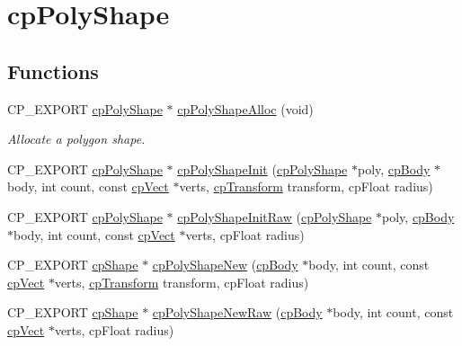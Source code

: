 \hypertarget{group__cpPolyShape}{}\section{cp\+Poly\+Shape}
\label{group__cpPolyShape}
\subsection*{Functions}
\begin{DoxyCompactItemize}
\item 
\mbox{\label{group__cpPolyShape_ga034bc6db096bcf82b76134075dc44f4f}} 
C\+P\+\_\+\+E\+X\+P\+O\+RT \hyperlink{structcpPolyShape}{cp\+Poly\+Shape} $\ast$ \hyperlink{group__cpPolyShape_ga034bc6db096bcf82b76134075dc44f4f}{cp\+Poly\+Shape\+Alloc} (void)
\begin{DoxyCompactList}\small\item\em Allocate a polygon shape. \end{DoxyCompactList}\item 
C\+P\+\_\+\+E\+X\+P\+O\+RT \hyperlink{structcpPolyShape}{cp\+Poly\+Shape} $\ast$ \hyperlink{group__cpPolyShape_ga8f30c48538498234bed45abc3c16b80d}{cp\+Poly\+Shape\+Init} (\hyperlink{structcpPolyShape}{cp\+Poly\+Shape} $\ast$poly, \hyperlink{structcpBody}{cp\+Body} $\ast$body, int count, const \hyperlink{structcpVect}{cp\+Vect} $\ast$verts, \hyperlink{structcpTransform}{cp\+Transform} transform, cp\+Float radius)
\item 
C\+P\+\_\+\+E\+X\+P\+O\+RT \hyperlink{structcpPolyShape}{cp\+Poly\+Shape} $\ast$ \hyperlink{group__cpPolyShape_ga9f76eb48b88f99b70639abbec33fb73a}{cp\+Poly\+Shape\+Init\+Raw} (\hyperlink{structcpPolyShape}{cp\+Poly\+Shape} $\ast$poly, \hyperlink{structcpBody}{cp\+Body} $\ast$body, int count, const \hyperlink{structcpVect}{cp\+Vect} $\ast$verts, cp\+Float radius)
\item 
C\+P\+\_\+\+E\+X\+P\+O\+RT \hyperlink{structcpShape}{cp\+Shape} $\ast$ \hyperlink{group__cpPolyShape_gaed41237141b0ef9066117a829bfce9e0}{cp\+Poly\+Shape\+New} (\hyperlink{structcpBody}{cp\+Body} $\ast$body, int count, const \hyperlink{structcpVect}{cp\+Vect} $\ast$verts, \hyperlink{structcpTransform}{cp\+Transform} transform, cp\+Float radius)
\item 
C\+P\+\_\+\+E\+X\+P\+O\+RT \hyperlink{structcpShape}{cp\+Shape} $\ast$ \hyperlink{group__cpPolyShape_ga9f913d3ac1991e4d248b1a51357a176a}{cp\+Poly\+Shape\+New\+Raw} (\hyperlink{structcpBody}{cp\+Body} $\ast$body, int count, const \hyperlink{structcpVect}{cp\+Vect} $\ast$verts, cp\+Float radius)

\end{DoxyCompactItemize}
